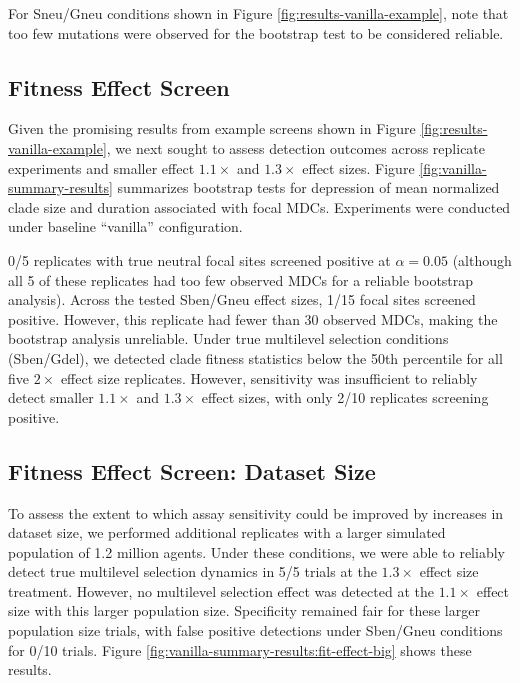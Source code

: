 For Sneu/Gneu conditions shown in Figure \ref{fig:results-vanilla-example}, note that too few mutations were observed for the bootstrap test to be considered reliable.

\subsection{Fitness Effect Screen}



Given the promising results from example screens shown in Figure \ref{fig:results-vanilla-example}, we next sought to assess detection outcomes across replicate experiments and smaller effect $1.1\times$ and $1.3\times$ effect sizes.
Figure \ref{fig:vanilla-summary-results} summarizes bootstrap tests for depression of mean normalized clade size and duration associated with focal MDCs.
Experiments were conducted under baseline ``vanilla'' configuration.

0/5 replicates with true neutral focal sites screened positive at $\alpha=0.05$ (although all 5 of these replicates had too few observed MDCs for a reliable bootstrap analysis).
Across the tested Sben/Gneu effect sizes, 1/15 focal sites screened positive. However, this replicate had fewer than 30 observed MDCs, making the bootstrap analysis unreliable.
Under true multilevel selection conditions (Sben/Gdel), we detected clade fitness statistics below the 50th percentile for all five $2\times$ effect size replicates.
However, sensitivity was insufficient to reliably detect smaller $1.1\times$ and $1.3\times$ effect sizes, with only 2/10 replicates screening positive.

\subsection{Fitness Effect Screen: Dataset Size}

To assess the extent to which assay sensitivity could be improved by increases in dataset size, we performed additional replicates with a larger simulated population of 1.2 million agents.
Under these conditions, we were able to reliably detect true multilevel selection dynamics in 5/5 trials at the $1.3\times$ effect size treatment.
However, no multilevel selection effect was detected at the $1.1\times$ effect size with this larger population size.
Specificity remained fair for these larger population size trials, with false positive detections under Sben/Gneu conditions for 0/10 trials.
Figure \ref{fig:vanilla-summary-results:fit-effect-big} shows these results.

